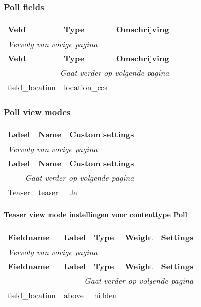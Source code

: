 \subsubsection{Poll fields}
  \begin{longtable}{| p{5.00cm}|p{5.00cm}|p{5.00cm}|}
  \hline
  \rowcolor{tableheader}
  \textbf{Veld} & \textbf{Type} & \textbf{Omschrijving}  \tabularnewline
  \hline
\endfirsthead
\multicolumn{3}{l}{\textit{Vervolg van vorige pagina}} \\
\hline
\rowcolor{tableheader}
  \textbf{Veld} & \textbf{Type} & \textbf{Omschrijving}  \tabularnewline
  \hline
\hline
\endhead
\multicolumn{3}{r}{\textit{Gaat verder op volgende pagina}} \\
\endfoot
\hline
\endlastfoot
  field\_location & location\_cck &   \tabularnewline
  \hline
  \end{longtable}

\subsubsection{Poll view modes}
  \begin{longtable}{| p{5.00cm}|p{5.00cm}|p{5.00cm}|}
  \hline
  \rowcolor{tableheader}
  \textbf{Label} & \textbf{Name} & \textbf{Custom settings}  \tabularnewline
  \hline
\endfirsthead
\multicolumn{3}{l}{\textit{Vervolg van vorige pagina}} \\
\hline
\rowcolor{tableheader}
  \textbf{Label} & \textbf{Name} & \textbf{Custom settings}  \tabularnewline
  \hline
\hline
\endhead
\multicolumn{3}{r}{\textit{Gaat verder op volgende pagina}} \\
\endfoot
\hline
\endlastfoot
  Teaser & teaser & Ja  \tabularnewline
  \hline
  \end{longtable}

\paragraph{Teaser view mode instellingen voor contenttype Poll }

  \begin{longtable}{| p{3.00cm}|p{3.00cm}|p{3.00cm}|p{3.00cm}|p{3.00cm}|}
  \hline
  \rowcolor{tableheader}
  \textbf{Fieldname} & \textbf{Label} & \textbf{Type} & \textbf{Weight} & \textbf{Settings}  \tabularnewline
  \hline
\endfirsthead
\multicolumn{5}{l}{\textit{Vervolg van vorige pagina}} \\
\hline
\rowcolor{tableheader}
  \textbf{Fieldname} & \textbf{Label} & \textbf{Type} & \textbf{Weight} & \textbf{Settings}  \tabularnewline
  \hline
\hline
\endhead
\multicolumn{5}{r}{\textit{Gaat verder op volgende pagina}} \\
\endfoot
\hline
\endlastfoot
  field\_location & above & hidden &   &    \tabularnewline
  \hline
  \end{longtable}

